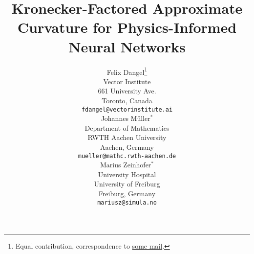 \newcommand{\papertitle}{%
  Kronecker-Factored Approximate Curvature for Physics-Informed Neural Networks 
}
\title{\papertitle}

%

\author{%
  Felix Dangel\thanks{Equal contribution, correspondence to \url{some mail}.}\\
  Vector Institute\\
  661 University Ave. \\
  Toronto, Canada \\
  \texttt{fdangel@vectorinstitute.ai} \\
  \And
  Johannes M\"uller$^*$\\
  Department of Mathematics \\
  RWTH Aachen University \\
  Aachen, Germany \\
  \texttt{mueller@mathc.rwth-aachen.de} \\
  \And
  Marius Zeinhofer$^*$\\
  University Hospital \\
  University of Freiburg \\
  Freiburg, Germany \\
  \texttt{mariusz@simula.no} 
}
